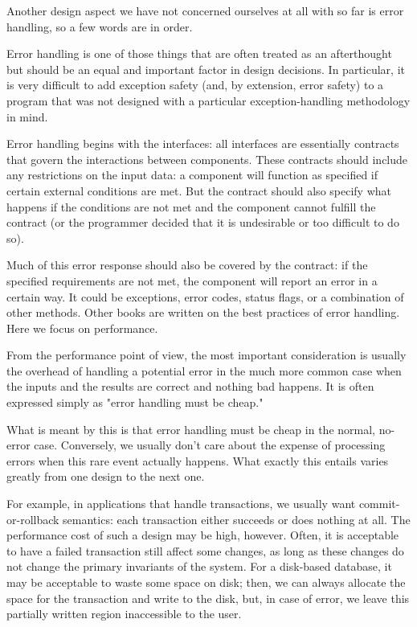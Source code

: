 Another design aspect we have not concerned ourselves at all with so far is error handling, so a few words are in order.


Error handling is one of those things that are often treated as an afterthought but should be an equal and important factor in design decisions. In particular, it is very difficult to add exception safety (and, by extension, error safety) to a program that was not designed with a particular exception-handling methodology in mind.

Error handling begins with the interfaces: all interfaces are essentially contracts that govern the interactions between components. These contracts should include any restrictions on the input data: a component will function as specified if certain external conditions are met. But the contract should also specify what happens if the conditions are not met and the component cannot fulfill the contract (or the programmer decided that it is undesirable or too difficult to do so). 

Much of this error response should also be covered by the contract: if the specified requirements are not met, the component will report an error in a certain way. It could be exceptions, error codes, status flags, or a combination of other methods. Other books are written on the best practices of error handling. Here we focus on performance.

From the performance point of view, the most important consideration is usually the overhead of handling a potential error in the much more common case when the inputs and the results are correct and nothing bad happens. It is often expressed simply as "error handling must be cheap."

What is meant by this is that error handling must be cheap in the normal, no-error case. Conversely, we usually don't care about the expense of processing errors when this rare event actually happens. What exactly this entails varies greatly from one design to the next one. 

For example, in applications that handle transactions, we usually want commit-or-rollback semantics: each transaction either succeeds or does nothing at all. The performance cost of such a design may be high, however. Often, it is acceptable to have a failed transaction still affect some changes, as long as these changes do not change the primary invariants of the system. For a disk-based database, it may be acceptable to waste some space on disk; then, we can always allocate the space for the transaction and write to the disk, but, in case of error, we leave this partially written region inaccessible to the user.

